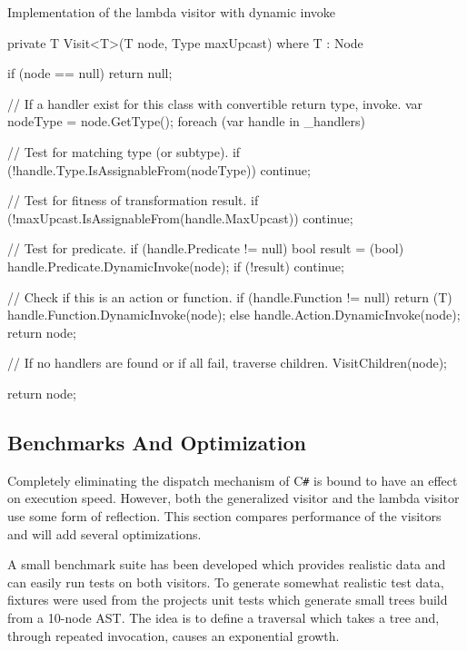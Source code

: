\documentclass[twoside,openright]{uva-bachelor-thesis}
\newcommand{\cs}{C\texttt{\#}\xspace}
\begin{document}
			\begin{codebox}[label=lambda-dyninvoke]{Implementation of the lambda visitor with dynamic invoke}
				\begin{csharpcode}
					private T Visit<T>(T node, Type maxUpcast)
						where T : Node
					{
						if (node == null)
							return null;
						
						// If a handler exist for this class with convertible return type, invoke.
						var nodeType = node.GetType();
						foreach (var handle in _handlers)
						{
							// Test for matching type (or subtype).
							if (!handle.Type.IsAssignableFrom(nodeType))
								continue;
							
							// Test for fitness of transformation result.
							if (!maxUpcast.IsAssignableFrom(handle.MaxUpcast))
								continue;
							
							// Test for predicate.
							if (handle.Predicate != null)
							{
								bool result = (bool) handle.Predicate.DynamicInvoke(node);
								if (!result)
									continue;
							}
							
							// Check if this is an action or function.
							if (handle.Function != null)
							{
								return (T) handle.Function.DynamicInvoke(node);
							}
							else
							{
								handle.Action.DynamicInvoke(node);
								return node;
							}
						}
						
						// If no handlers are found or if all fail, traverse children.
						VisitChildren(node);
						
						return node;
					}
				\end{csharpcode}
			\end{codebox}
			
			
		\subsection{Benchmarks And Optimization}
			Completely eliminating the dispatch mechanism of \cs is bound to have an effect on execution speed. However, both the generalized visitor and the lambda visitor use some form of reflection. This section compares performance of the visitors and will add several optimizations.
			
			A small benchmark suite has been developed which provides realistic data and can easily run tests on both visitors. To generate somewhat realistic test data, fixtures were used from the projects unit tests which generate small trees build from a 10-node AST. The idea is to define a traversal which takes a tree and, through repeated invocation, causes an exponential growth.
			
\end{document}
